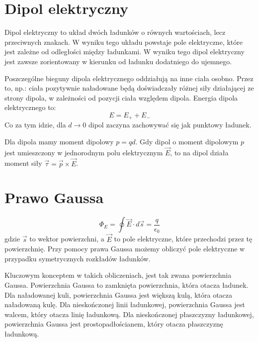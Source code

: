 \documentclass{../notatki}
\begin{document}
\section{Dipol elektryczny}

Dipol elektryczny to układ dwóch ładunków o równych wartościach, lecz
przeciwnych znakach. W wyniku tego układu powstaje pole elektryczne, które
jest zależne od odległości między ładunkami. W wyniku tego dipol elektryczny
jest zawsze zorientowany w kierunku od ładunku dodatniego do ujemnego.
\begin{figure}[h]
  \centering
\end{figure}

Poszczególne bieguny dipola elektrycznego oddziałują na inne ciała osobno.
Przez to, np.: ciała pozytywnie naładowane będą doświadczały różnej siły
działającej ze strony dipola, w zależności od pozycji ciała względem dipola.
Energia dipola elektrycznego to:
$$
E = E_+ + E_-
$$
Co za tym idzie, dla $d \rightarrow 0$ dipol zaczyna zachowywać się jak
punktowy ładunek.

Dla dipola mamy moment dipolowy $p = qd$. Gdy dipol o moment dipolowym $p$ jest
umieszczony w jednorodnym polu elektrycznym $\vec{E}$, to na dipol działa moment
siły $\vec{\tau} = \vec{p} \times \vec{E}$.

\section{Prawo Gaussa}

$$
\Phi_E = \oint \vec{E} \cdot d\vec{s} = \frac{q}{\epsilon_0}
$$
gdzie $\vec{s}$ to wektor powierzchni, a $\vec{E}$ to pole elektryczne, które
przechodzi przez tę powierzchnię. Przy pomocy prawa Gaussa możemy
obliczyć pole elektryczne w przypadku symetrycznych rozkładów ładunków.

Kluczowym konceptem w takich obliczeniach, jest tak zwana powierzchnia
Gaussa. Powierzchnia Gaussa to zamknięta powierzchnia, która otacza
ładunek. Dla naładowanej kuli, powierzchnia Gaussa jest większą kulą, która
otacza naładowaną kulę. Dla nieskończonej linii ładunkowej, powierzchnia Gaussa
jest walcem, który otacza linię ładunkową. Dla nieskończonej płaszczyzny
ładunkowej, powierzchnia Gaussa jest prostopadłościanem, który otacza
płaszczyznę ładunkową.
\end{document}
